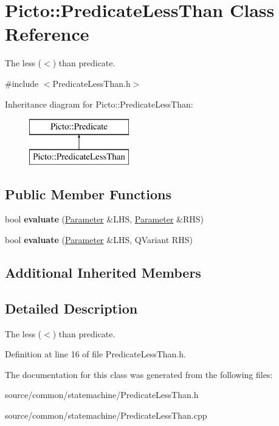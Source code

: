 \hypertarget{class_picto_1_1_predicate_less_than}{\section{Picto\-:\-:Predicate\-Less\-Than Class Reference}
\label{class_picto_1_1_predicate_less_than}
}


The less ($<$) than predicate.  




{\ttfamily \#include $<$Predicate\-Less\-Than.\-h$>$}

Inheritance diagram for Picto\-:\-:Predicate\-Less\-Than\-:\begin{figure}[H]
\begin{center}
\leavevmode
\includegraphics[height=2.000000cm]{class_picto_1_1_predicate_less_than}
\end{center}
\end{figure}
\subsection*{Public Member Functions}
\begin{DoxyCompactItemize}
\item 
\hypertarget{class_picto_1_1_predicate_less_than_abf726eb84d32eefb24a82dffca937500}{bool {\bfseries evaluate} (\hyperlink{class_picto_1_1_parameter}{Parameter} \&L\-H\-S, \hyperlink{class_picto_1_1_parameter}{Parameter} \&R\-H\-S)}\label{class_picto_1_1_predicate_less_than_abf726eb84d32eefb24a82dffca937500}

\item 
\hypertarget{class_picto_1_1_predicate_less_than_a8da221ac3fa12cabd6998cb597b058ab}{bool {\bfseries evaluate} (\hyperlink{class_picto_1_1_parameter}{Parameter} \&L\-H\-S, Q\-Variant R\-H\-S)}\label{class_picto_1_1_predicate_less_than_a8da221ac3fa12cabd6998cb597b058ab}

\end{DoxyCompactItemize}
\subsection*{Additional Inherited Members}


\subsection{Detailed Description}
The less ($<$) than predicate. 

Definition at line 16 of file Predicate\-Less\-Than.\-h.



The documentation for this class was generated from the following files\-:\begin{DoxyCompactItemize}
\item 
source/common/statemachine/Predicate\-Less\-Than.\-h\item 
source/common/statemachine/Predicate\-Less\-Than.\-cpp\end{DoxyCompactItemize}

